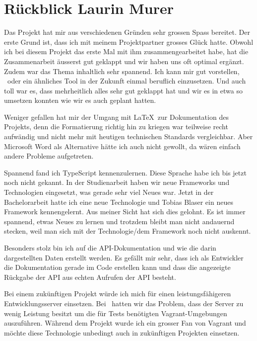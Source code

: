 \section*{Rückblick Laurin Murer}
	Das Projekt hat mir aus verschiedenen Gründen sehr grossen Spass bereitet.
	Der erste Grund ist, dass ich mit meinem Projektpartner grosses Glück hatte.
	Obwohl ich bei diesem Projekt das erste Mal mit ihm zusammengearbeitet habe,
	hat die Zusammenarbeit äusserst gut geklappt und wir haben uns oft optimal ergänzt.
	Zudem war das Thema inhaltlich sehr spannend.
	Ich kann mir gut vorstellen, \eeppi\ oder ein ähnliches Tool in der Zukunft einmal beruflich einzusetzen.
	Und auch toll war es, dass mehrheitlich alles sehr gut geklappt hat und wir es in etwa so umsetzen konnten wie wir es auch geplant hatten.
	
	Weniger gefallen hat mir der Umgang mit \LaTeX\ zur Dokumentation des Projekts,
	denn die Formatierung richtig hin zu kriegen war teilweise recht aufwändig
	und nicht mehr mit heutigen technischen Standards vergleichbar.
	Aber Microsoft Word als Alternative hätte ich auch nicht gewollt, da wären einfach andere Probleme aufgetreten.
	
	Spannend fand ich TypeScript kennenzulernen. Diese Sprache habe ich bis jetzt noch nicht gekannt.
	In der Studienarbeit haben wir neue Frameworks und Technologien eingesetzt, was gerade sehr viel Neues war.
	Jetzt in der Bachelorarbeit hatte ich eine neue Technologie und Tobias Blaser ein neues Framework kennengelernt.
	Aus meiner Sicht hat sich dies gelohnt. Es ist immer spannend, etwas Neues zu lernen
	und trotzdem bleibt man nicht andauernd stecken, weil man sich mit der Technologie/dem Framework noch nicht auskennt.
	
	Besonders stolz bin ich auf die API-Dokumentation und wie die darin dargestellten Daten erstellt werden.
	Es gefällt mir sehr, dass ich als Entwickler die Dokumentation gerade im Code erstellen kann
	und dass die angezeigte Rückgabe der API aus echten Aufrufen der API besteht.
	
	Bei einem zukünftigen Projekt würde ich mich für einen leistungsfähigeren Entwicklungsserver einsetzen.
	Bei \eeppi\ hatten wir das Problem, dass der Server zu wenig Leistung besitzt um die für Tests benötigten Vagrant-Umgebungen auszuführen.
	Während dem Projekt wurde ich ein grosser Fan von Vagrant und möchte diese Technologie unbedingt auch in zukünftigen Projekten einsetzen.
